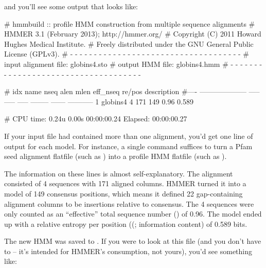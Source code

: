 
and you'll see some output that looks like:

\begin{samepage}
\begin{sreoutput}
# hmmbuild :: profile HMM construction from multiple sequence alignments
# HMMER 3.1 (February 2013); http://hmmer.org/
# Copyright (C) 2011 Howard Hughes Medical Institute.
# Freely distributed under the GNU General Public License (GPLv3).
# - - - - - - - - - - - - - - - - - - - - - - - - - - - - - - - - - - - -
# input alignment file:             globins4.sto
# output HMM file:                  globins4.hmm
# - - - - - - - - - - - - - - - - - - - - - - - - - - - - - - - - - - - -

# idx name                  nseq  alen  mlen eff_nseq re/pos description
#---- -------------------- ----- ----- ----- -------- ------ -----------
1     globins4                 4   171   149     0.96  0.589 

# CPU time: 0.24u 0.00s 00:00:00.24 Elapsed: 00:00:00.27
\end{sreoutput}
\end{samepage}

If your input file had contained more than one alignment, you'd get
one line of output for each model. For instance, a single
 command suffices to turn a Pfam seed alignment
flatfile (such as ) into a profile HMM flatfile
(such as ).

The information on these lines is almost self-explanatory. The
 alignment consisted of 4 sequences with 171 aligned
columns. HMMER turned it into a model of 149 consensus positions,
which means it defined 22 gap-containing alignment columns to be
insertions relative to consensus. The 4 sequences were only counted as
an ``effective'' total sequence number () of 0.96. The
model ended up with a relative entropy per position ((;
information content) of 0.589 bits.


The new HMM was saved to . If you were to look at
this file (and you don't have to -- it's intended for HMMER's
consumption, not yours), you'd see something like:

